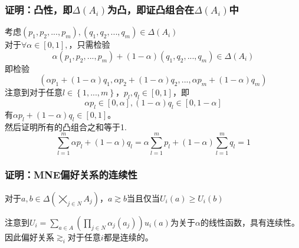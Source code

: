 \documentclass{beamer}
\begin{document}
\begin{frame}[label = MNE_Delta_A_i_convex]
	\frametitle{证明：凸性，即$ \Delta \left(A_{i}\right) $为凸，即证凸组合在$ \Delta \left(A_{i}\right) $中}
	考虑$\left(p_{1},p_{2},...,p_{m}\right),\left(q_{1},q_{2},...,q_{m}\right)\in \Delta \left(A_{i}\right)$\\
	对于$\forall \alpha \in \left[0,1\right],$，只需检验
	$$\alpha\left(p_{1},p_{2},...,p_{m}\right)+\left(1-\alpha\right)\left(q_{1},q_{2},...,q_{m}\right)\in \Delta \left(A_{i}\right)$$
	即检验
	$$\left( \alpha p_{1} + \left(1-\alpha\right) q_{1} ,\alpha p_{2} + \left(1-\alpha\right) q_{2} ,...,\alpha p_{m} + \left(1-\alpha\right) q_{m}\right)$$
	注意到对于任意$l\in \left\lbrace1,...,m \right\rbrace$，$p_{l},q_{l}\in \left[0,1\right]$，即$$\alpha p_{l}\in \left[0,\alpha\right],\left(1-\alpha\right) q_{l}\in \left[0,1-\alpha\right]$$
	有$\alpha p_{l} + \left(1-\alpha\right) q_{l} \in \left[0,1\right]$。\\
	然后证明所有的凸组合之和等于1.
	$$\sum_{l=1}^{m}\alpha p_{l}+\left(1-\alpha\right)q_{l}=\alpha \sum_{l=1}^{m}p_{l}+\left(1-\alpha\right)\sum_{l=1}^{m}q_{l}=1$$
\end{frame}
\begin{frame}[label = MNE_preference_continuous]
	\frametitle{证明：MNE偏好关系的连续性}
	\begin{theorem}[VNM效用函数的偏好关系]
		\fangsong 
		对于$a,b\in \Delta \left(\bigtimes\limits_{j\in N}A_{j}\right)$，$a\apprge b$当且仅当$U_{i}\left( a\right) \geqslant U_{i}\left( b\right) $
	\end{theorem}
	 注意到$U_{i}=\sum\limits_{a\in A}\left(\prod\limits_{j\in N} \alpha_{j}\left(a_{j}\right)\right)u_{i}\left(a\right)$为关于$\alpha$的线性函数，具有连续性。因此偏好关系$\apprge_{i}$对于任意$i$都是连续的。
\end{frame}
\end{document}
